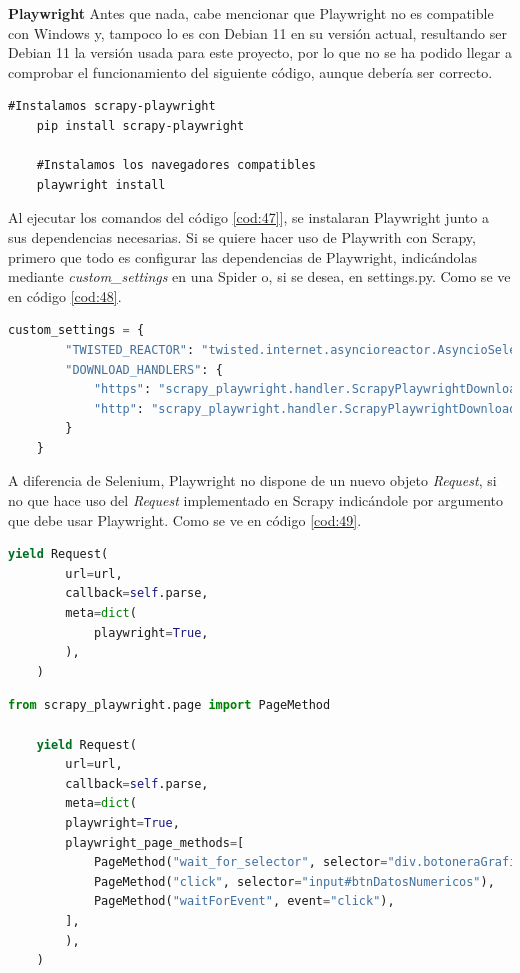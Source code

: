 \textbf{Playwright}\newline
\newline
Antes que nada, cabe mencionar que Playwright no es compatible con Windows y, tampoco lo es con Debian 11 en su versión actual, resultando ser Debian 11 la versión usada para este proyecto, por lo que no se ha podido llegar a comprobar el funcionamiento del siguiente código, aunque debería ser correcto.

\begin{lstlisting}[caption={Instalación Playwright}, label=cod:47]
	#Instalamos scrapy-playwright
	pip install scrapy-playwright
	
	#Instalamos los navegadores compatibles
	playwright install
\end{lstlisting}

Al ejecutar los comandos del código \ref{cod:47}], se instalaran Playwright junto a sus dependencias necesarias. Si se quiere hacer uso de Playwrith con Scrapy, primero que todo es configurar las dependencias de Playwright, indicándolas mediante \textit{custom\_settings} en una Spider o, si se desea, en settings.py. Como se ve en código \ref{cod:48}.

\begin{lstlisting}[language=Python, caption={Configuración Playwright con Scrapy}, label=cod:48]
	custom_settings = {
		"TWISTED_REACTOR": "twisted.internet.asyncioreactor.AsyncioSelectorReactor",
		"DOWNLOAD_HANDLERS": {
			"https": "scrapy_playwright.handler.ScrapyPlaywrightDownloadHandler",
			"http": "scrapy_playwright.handler.ScrapyPlaywrightDownloadHandler",
		}
	}
\end{lstlisting}

A diferencia de Selenium, Playwright no dispone de un nuevo objeto \textit{Request}, si no que hace uso del \textit{Request} implementado en Scrapy indicándole por argumento que debe usar Playwright. Como se ve en código \ref{cod:49}.

\begin{lstlisting}[language=Python, caption={Playwright basic Request}, label=cod:49]
	yield Request(
		url=url,
		callback=self.parse,
		meta=dict(
			playwright=True,
		),
	)
\end{lstlisting}

\begin{lstlisting}[language=Python, caption={Agua en Navarra Playwright Request}, label=cod:50]
	from scrapy_playwright.page import PageMethod
	
	yield Request(
		url=url,
		callback=self.parse,
		meta=dict(
		playwright=True,
		playwright_page_methods=[
			PageMethod("wait_for_selector", selector="div.botoneraGrafico", state="visible"),
			PageMethod("click", selector="input#btnDatosNumericos"),
			PageMethod("waitForEvent", event="click"),
		],
		),
	)
\end{lstlisting}

